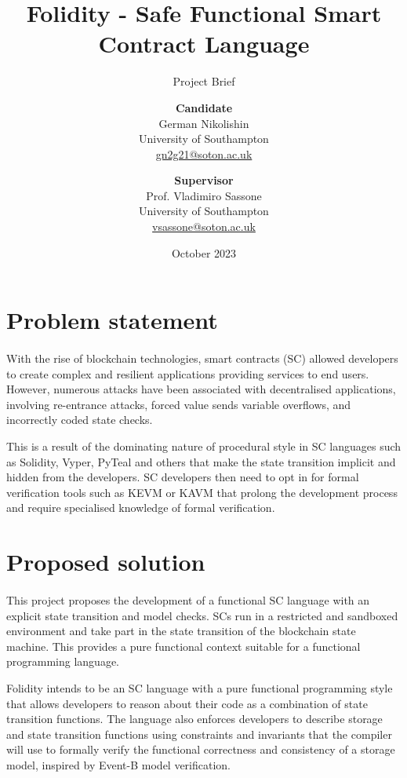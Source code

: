 \documentclass[10pt, a4paper]{article}
\title{Folidity - Safe Functional Smart Contract Language}
\subtitle{Project Brief}
\author{
  \textbf{Candidate}\\
  German Nikolishin\\
  University of Southampton\\
  \href{mailto:gn2g21@soton.ac.uk}{gn2g21@soton.ac.uk}
  \and
  \textbf{Supervisor}\\
  Prof. Vladimiro Sassone\\
  University of Southampton\\
  \href{mailto:vsassone@soton.ac.uk}{vsassone@soton.ac.uk}
}
\date{October 2023}
\begin{document}
\maketitle
\thispagestyle{empty}



\section*{Problem statement}
\paragraph{}
With the rise of blockchain technologies, smart contracts (SC) allowed developers to create complex and resilient applications providing services to end users. However, numerous attacks have been associated with decentralised applications, involving re-entrance attacks, forced value sends variable overflows, and incorrectly coded state checks.

This is a result of the dominating nature of procedural style in SC languages such as Solidity, Vyper, PyTeal and others that make the state transition implicit and hidden from the developers. SC developers then need to opt in for formal verification tools such as KEVM or KAVM that prolong the development process and require specialised knowledge of formal verification.

\section*{Proposed solution}
\paragraph{}
This project proposes the development of a functional SC language with an explicit state transition and model checks. SCs run in a restricted and sandboxed environment and take part in the state transition of the blockchain state machine. This provides a pure functional context suitable for a functional programming language. 

Folidity intends to be an SC language with a pure functional programming style that allows developers to reason about their code as a combination of state transition functions. The language also enforces developers to describe storage and state transition functions using constraints and invariants that the compiler will use to formally verify the functional correctness and consistency of a storage model, inspired by Event-B model verification.
\end{document}
